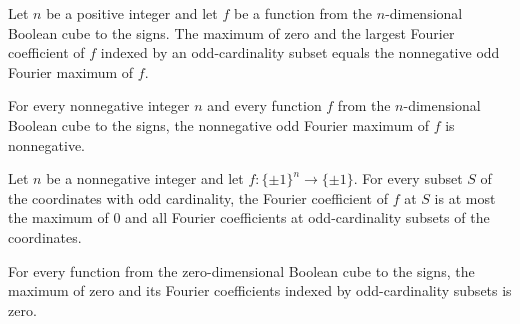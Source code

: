 \begin{theorem}
\label{FABL.nonnegativeOddFourierMaximum_eq_max}
\leanok
{}
Let $n$ be a positive integer and let $f$ be a function from the $n$-dimensional Boolean
cube to the signs. The maximum of zero and the largest Fourier coefficient of $f$
indexed by an odd-cardinality subset equals the nonnegative odd Fourier maximum of $f$.
\end{theorem}

\begin{theorem}
\label{FABL.nonnegativeOddFourierMaximum_zero_le}
\leanok
{}
For every nonnegative integer $n$ and every function $f$ from the $n$-dimensional
Boolean cube to the signs, the nonnegative odd Fourier maximum of $f$ is nonnegative.
\end{theorem}

\begin{theorem}
\label{FABL.fourierCoeff_le_nonnegativeOddFourierMaximum}
\leanok
{}
Let $n$ be a nonnegative integer and let $f:\{\pm1\}^n\to\{\pm1\}$. For every subset $S$
of the coordinates with odd cardinality, the Fourier coefficient of $f$ at $S$ is at
most the maximum of $0$ and all Fourier coefficients at odd-cardinality subsets of the
coordinates.
\end{theorem}

\begin{theorem}
\label{FABL.nonnegativeOddFourierMaximum_dimension_zero}
\leanok
{}
For every function from the zero-dimensional Boolean cube to the signs, the maximum of
zero and its Fourier coefficients indexed by odd-cardinality subsets is zero.
\end{theorem}


